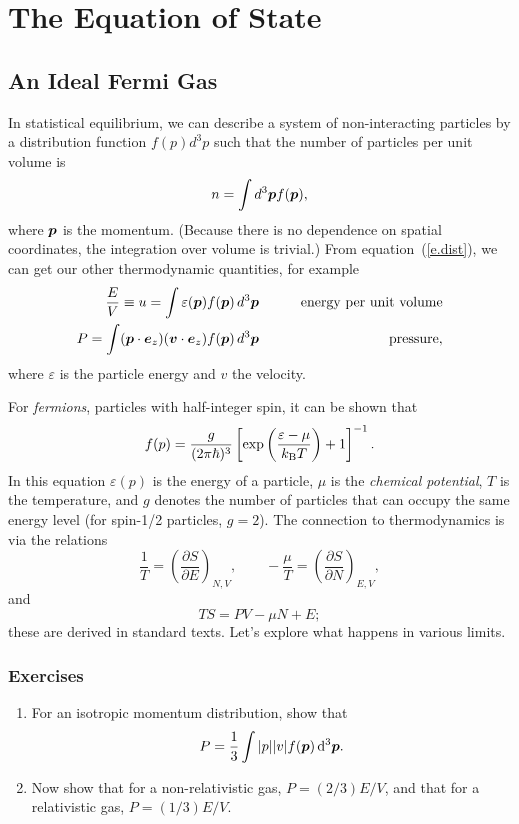 \chapter{The Equation of State}
\newcommand{\vp}{\ensuremath{\bvec{p}}}
\renewcommand{\pF}{\ensuremath{p_{\mathrm{F}}}}
\newcommand{\eF}{\ensuremath{\varepsilon_{\mathrm{F}}}}

\section{An Ideal Fermi Gas}
In statistical equilibrium, we can describe a system of non-interacting particles by a distribution function $f(p)d^{3}p$ such that the number of particles per unit volume is
\begin{equation}\label{e.dist}
n = \int d^{3}\vp f(\vp),
\end{equation}
where $\vp$ is the momentum. (Because there is no dependence on spatial coordinates, the integration over volume is trivial.) From equation~(\ref{e.dist}), we can get our other thermodynamic quantities, for example
\begin{eqnarray}
\frac{E}{V} \equiv u = \int  \varepsilon(\vp) f(\vp)\,d^{3}\vp &\qquad& \textrm{energy per unit volume}\label{e.u}\\
P = \int  (\vp\cdot\bvec{e}_{z})(\bvec{v}\cdot\bvec{e}_{z}) f(\vp)\,d^{3}\vp &\qquad& \textrm{pressure},\label{e.P}
\end{eqnarray}
where $\varepsilon$ is the particle energy and $v$ the velocity.

For \emph{fermions}, particles with half-integer spin, it can be shown that
\begin{equation}\label{e.fermion}
f(p) = \frac{g}{(2\pi\hbar)^{3}} \left[\exp\left(\frac{\varepsilon-\mu}{k_\mathrm{B} T}\right)+1\right]^{-1}.
\end{equation}
In this equation $\varepsilon(p)$ is the energy of a particle, $\mu$ is the \emph{chemical potential}, $T$ is the temperature, and $g$ denotes the number of particles that can occupy the same energy level (for spin-1/2 particles, $g=2$).  The connection to thermodynamics is via the relations
\[
\frac{1}{T} = \left(\frac{\partial S}{\partial E}\right)_{N,V},\qquad -\frac{\mu}{T} = \left(\frac{\partial S}{\partial N}\right)_{E,V},
\]
and 
\[
TS = PV - \mu N + E;
\]
these are derived in standard texts. Let's explore what happens in various limits.  

\subsection{Exercises}
\begin{enumerate}
\item For an isotropic momentum distribution, show that 
\[
P = \frac{1}{3}\int |p||v| f(\vp)\,\dif^{3}\vp.
\]
\item Now show that for a non-relativistic gas, $P = (2/3)E/V$, and that for a relativistic gas, $P = (1/3)E/V$.
\end{enumerate}

